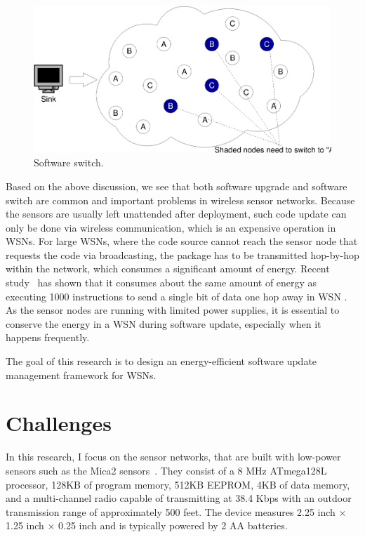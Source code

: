 \begin{figure}[htbp]
	\centering
		\includegraphics[scale=0.38]{figures/switch.eps}
	\caption{Software switch.}
	\label{fig:switch}
\end{figure}

Based on the above discussion, we see that both software upgrade and software switch are common and important problems in wireless sensor networks. Because the sensors are usually left unattended after deployment, such code update can only be done via wireless communication, which is an expensive operation in WSNs. For large WSNs, where the code source cannot reach the sensor node that requests the code via broadcasting, the package has to be transmitted hop-by-hop within the network, which consumes a significant amount of energy. Recent study~\cite{related:barr-energy} has shown that it consumes about the same amount of energy as executing 1000 instructions to send a single bit of data one hop away in WSN . As the sensor nodes are running with limited power supplies, it is essential to conserve the energy in a WSN during software update, especially when it happens frequently.

The goal of this research is to design an energy-efficient software update management framework for WSNs. 

\section{Challenges}

In this research, I focus on the sensor networks, that are built with low-power sensors such as the Mica2 sensors~\cite{mica2-power}. They consist of a 8 MHz ATmega128L processor, 128KB of program memory, 512KB EEPROM, 4KB of data memory, and a multi-channel radio capable of transmitting at 38.4 Kbps with an outdoor transmission range of approximately 500 feet. The device measures 2.25 inch $\times$ 1.25 inch $\times$ 0.25 inch and is typically powered by 2 AA batteries.

